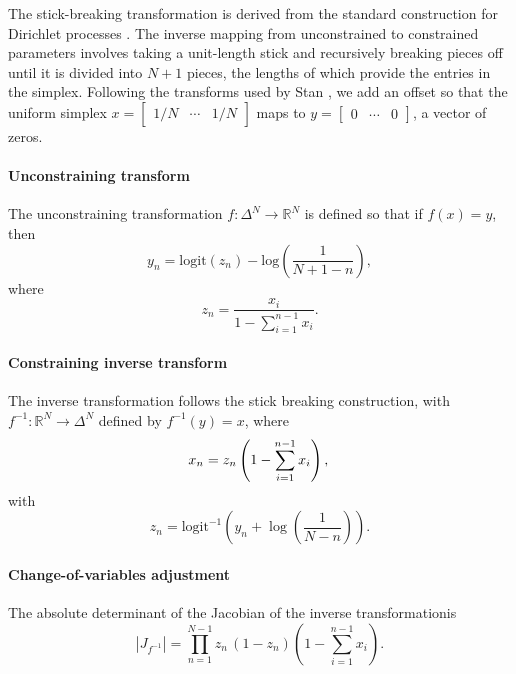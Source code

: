 \documentclass[11pt]{article}
\newcommand{\abs}[1]{\left| #1 \right|}
\begin{document}
The stick-breaking transformation is derived from the standard construction for Dirichlet processes \cite{sethuraman1994constructive}. The inverse mapping from unconstrained to constrained parameters involves taking a unit-length stick and recursively breaking pieces off until it is divided into $N + 1$ pieces, the lengths of which provide the entries in the simplex.  Following the transforms used by Stan \cite{stan2022ref}, we add an offset so that the uniform simplex $x = \begin{bmatrix} 1/N & \cdots & 1/N \end{bmatrix}$ maps to $y = \begin{bmatrix} 0 & \cdots & 0 \end{bmatrix}$, a vector of zeros.

\paragraph{Unconstraining transform}
The unconstraining transformation $f : \Delta^{N} \to  \mathbb{R}^N$ is defined so that if $f(x) = y$, then
\[
y_n
= \mathrm{logit}(z_n)
  - \mbox{log}\left(\frac{1}{N + 1 - n} \right),
\]
where 
\[ 
 z_n = \frac{x_i}{1 - \sum_{i = 1}^{n-1} x_{i}}.
\]

\paragraph{Constraining inverse transform}
The inverse transformation follows the stick breaking construction, with $f^{-1} \colon \mathbb{R}^N \to \Delta^N$ defined by $f^{-1}(y) = x$, where
\[
x_n = z_n \left( 1 - \sum_{i=1}^{n-1} x_i \right), \\
\]
with
\[
z_n = \mathrm{logit}^{-1}\!\left(
y_n  + \log \left( \frac{1}{N - n} \right)
\right).
\]
                                            
\paragraph{Change-of-variables adjustment} 
The absolute determinant of the Jacobian of the inverse transformationis
\[
\abs{J_{f^{-1}}} 
= \prod_{n=1}^{N-1}
   z_n \, (1 - z_n)
   \left( 1 - \sum_{i=1}^{n-1} x_{i} \right).
\]
\end{document}
